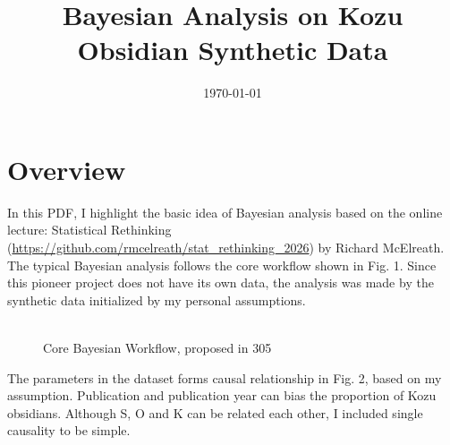 \documentclass{article}
\title{Bayesian Analysis on Kozu Obsidian Synthetic Data}
\date{\today}
\begin{document}
\maketitle

\section{Overview}

In this PDF, I highlight the basic idea of Bayesian analysis based on the online lecture: Statistical Rethinking (\url{https://github.com/rmcelreath/stat_rethinking_2026}) by Richard McElreath. 
The typical Bayesian analysis follows the core workflow shown in Fig. 1. 
Since this pioneer project does not have its own data, the analysis was made by the synthetic data initialized by my personal assumptions. \\
\\


\begin{figure}[H]

    \centering
    \caption{Core Bayesian Workflow, proposed in 305}
\end{figure}


The parameters in the dataset forms causal relationship in Fig. 2, based on my assumption. 
Publication and publication year can bias the proportion of Kozu obsidians. Although S, O and K can be related each other, I included single causality to be simple. 
\end{document}
